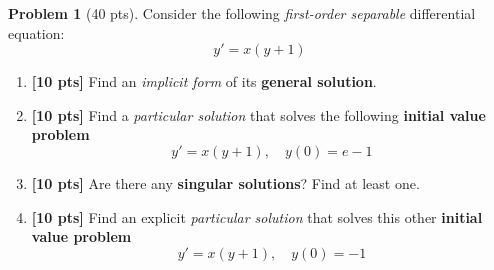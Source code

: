 \documentclass[12pt]{article}
\theoremstyle{definition}
\newtheorem{problem}{Problem}
\begin{document}
  \begin{problem}[40 pts]
  Consider the following \emph{first-order separable} differential equation:
  \begin{equation*}
  y' = x(y+1)
  \end{equation*}
  \begin{enumerate}
    \item \textbf{[10 pts]} Find an \emph{implicit form} of its \textbf{general solution}.
    \vspace{4.25cm}
    \begin{flushright}
    \end{flushright}  
    \item \textbf{[10 pts]} Find a \emph{particular solution} that solves the following \textbf{initial value problem}
    \begin{equation*}
    y' = x(y+1), \quad y(0) = e-1
    \end{equation*}
    \begin{flushright}
    \end{flushright}
    \item \textbf{[10 pts]} Are there any \textbf{singular solutions}?  Find at least one.
    \begin{flushright}
    \end{flushright}
    \item \textbf{[10 pts]} Find an explicit \emph{particular solution} that solves this other \textbf{initial value problem}
    \begin{equation*}
    y' = x(y+1), \quad y(0) = -1
    \end{equation*}
    \begin{flushright}
    \end{flushright}
  \end{enumerate}
  \end{problem}
  \newpage
\end{document}

